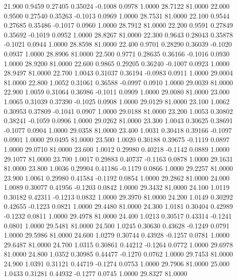   21.900   0.9459   0.27405   0.35024  -0.1008   0.0978   1.0000  28.7122  81.0000
  22.000   0.9500   0.27540   0.35263  -0.1013   0.0969   1.0000  28.7531  81.0000
  22.100   0.9544   0.27685   0.35486  -0.1017   0.0960   1.0000  28.7912  81.0000
  22.200   0.9591   0.27849   0.35692  -0.1019   0.0952   1.0000  28.8267  81.0000
  22.300   0.9643   0.28043   0.35878  -0.1021   0.0944   1.0000  28.8598  81.0000
  22.400   0.9701   0.28290   0.36039  -0.1020   0.0937   1.0000  28.8906  81.0000
  22.500   0.9771   0.28635   0.36166  -0.1016   0.0930   1.0000  28.9200  81.0000
  22.600   0.9865   0.29205   0.36240  -0.1007   0.0923   1.0000  28.9497  81.0000
  22.700   1.0043   0.31037   0.36194  -0.0983   0.0911   1.0000  29.0004  81.0000
  22.800   1.0052   0.31061   0.36588  -0.0997   0.0910   1.0000  29.0039  81.0000
  22.900   1.0059   0.31064   0.36986  -0.1011   0.0909   1.0000  29.0080  81.0000
  23.000   1.0065   0.31039   0.37390  -0.1025   0.0908   1.0000  29.0129  81.0000
  23.100   1.0062   0.30953   0.37809  -0.1041   0.0907   1.0000  29.0188  81.0000
  23.200   1.0053   0.30802   0.38241  -0.1059   0.0906   1.0000  29.0262  81.0000
  23.300   1.0043   0.30625   0.38691  -0.1077   0.0904   1.0000  29.0358  81.0000
  23.400   1.0031   0.30418   0.39166  -0.1097   0.0901   1.0000  29.0495  81.0000
  23.500   1.0020   0.30188   0.39675  -0.1119   0.0897   1.0000  29.0710  81.0000
  23.600   1.0012   0.29980   0.40218  -0.1142   0.0889   1.0000  29.1077  81.0000
  23.700   1.0017   0.29883   0.40737  -0.1163   0.0878   1.0000  29.1631  81.0000
  23.800   1.0036   0.29904   0.41186  -0.1179   0.0866   1.0000  29.2257  81.0000
  23.900   1.0061   0.29980   0.41584  -0.1192   0.0854   1.0000  29.2862  81.0000
  24.000   1.0089   0.30077   0.41956  -0.1203   0.0842   1.0000  29.3432  81.0000
  24.100   1.0119   0.30182   0.42311  -0.1213   0.0832   1.0000  29.3970  81.0000
  24.200   1.0149   0.30292   0.42655  -0.1223   0.0821   1.0000  29.4480  81.0000
  24.300   1.0181   0.30404   0.42989  -0.1232   0.0811   1.0000  29.4978  81.0000
  24.400   1.0213   0.30517   0.43314  -0.1241   0.0801   1.0000  29.5481  81.0000
  24.500   1.0245   0.30630   0.43628  -0.1249   0.0791   1.0000  29.5986  81.0000
  24.600   1.0279   0.30744   0.43928  -0.1257   0.0781   1.0000  29.6487  81.0000
  24.700   1.0315   0.30861   0.44212  -0.1264   0.0772   1.0000  29.6978  81.0000
  24.800   1.0352   0.30985   0.44477  -0.1270   0.0762   1.0000  29.7453  81.0000
  24.900   1.0391   0.31121   0.44719  -0.1274   0.0753   1.0000  29.7906  81.0000
  25.000   1.0433   0.31281   0.44932  -0.1277   0.0745   1.0000  29.8327  81.0000
